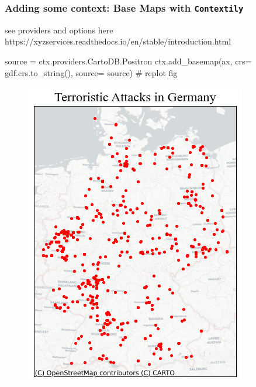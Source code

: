 \documentclass[
  letterpaper,
  DIV=11,
  numbers=noendperiod]{scrreprt}
\newenvironment{Shaded}{\begin{snugshade}}{\end{snugshade}}
\newcommand{\CommentTok}[1]{\textcolor[rgb]{0.37,0.37,0.37}{#1}}
\newcommand{\NormalTok}[1]{\textcolor[rgb]{0.00,0.23,0.31}{#1}}
\newcommand{\OperatorTok}[1]{\textcolor[rgb]{0.37,0.37,0.37}{#1}}
\begin{document}
\hypertarget{adding-some-context-base-maps-with-contextily}{%
\subsubsection{\texorpdfstring{Adding some context: Base Maps with
\texttt{Contextily}}{Adding some context: Base Maps with Contextily}}\label{adding-some-context-base-maps-with-contextily}}

see providers and options here
https://xyzservices.readthedocs.io/en/stable/introduction.html

\begin{Shaded}
\begin{Highlighting}[]
\NormalTok{source }\OperatorTok{=}\NormalTok{ ctx.providers.CartoDB.Positron}
\NormalTok{ctx.add\_basemap(ax, crs}\OperatorTok{=}\NormalTok{ gdf.crs.to\_string(), source}\OperatorTok{=}\NormalTok{ source)}
\CommentTok{\# replot}
\NormalTok{fig}
\end{Highlighting}
\end{Shaded}

\begin{figure}[H]

{\centering \includegraphics{labs/w02_maps_files/figure-pdf/cell-7-output-1.png}

}

\end{figure}
\end{document}
